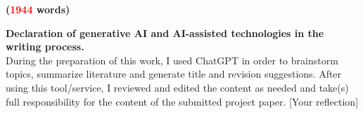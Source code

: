 \documentclass[12pt,twoside]{article}
\begin{document}
\vspace{-2\baselineskip}

\begin{flushright}\textbf{(\textcolor{red}{1944} words)}\end{flushright}

\vspace{-\baselineskip}

\textbf{Declaration of generative AI and AI-assisted technologies in the writing process.}\\
During the preparation of this work, I used ChatGPT in order to brainstorm topics, summarize literature and generate title and revision suggestions.
After using this tool/service, I reviewed and edited the content as needed and take(s) full responsibility for the content of the submitted project paper.
[Your reflection]

\vspace{\baselineskip}

\printbibliography[heading=normalrefs,title={References}]
\end{document}
